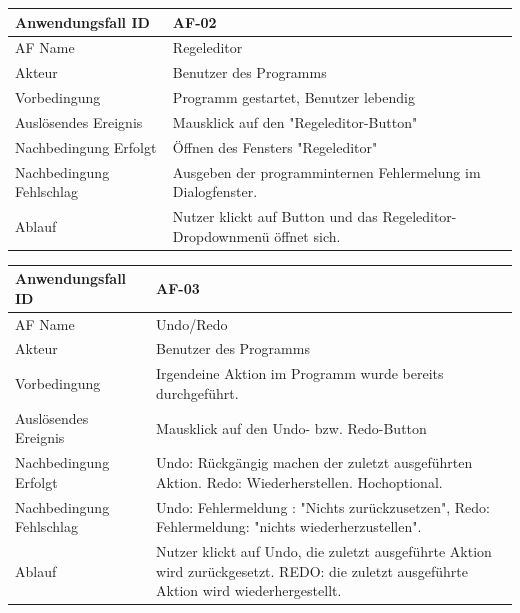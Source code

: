\documentclass[11pt,a4paper]{article}
\begin{document}
\begin{tabular}[m]{|m{7cm}|m{9cm}|}
    \hline
    Anwendungsfall ID     & AF-02 \\
         \hline
    AF Name     &  Regeleditor \\
         \hline
    Akteur&Benutzer des Programms \\
    \hline
    Vorbedingung&Programm gestartet, Benutzer lebendig\\
    \hline
    Auslösendes Ereignis&Mausklick auf den "Regeleditor-Button"\\
    \hline
    Nachbedingung Erfolgt&Öffnen des Fensters "Regeleditor"\\
    \hline
    Nachbedingung Fehlschlag&Ausgeben der programminternen Fehlermelung im Dialogfenster.\\
    \hline
    Ablauf&Nutzer klickt auf Button und das Regeleditor-Dropdownmenü öffnet sich.\\
    \hline
\end{tabular}
\par


\begin{tabular}[m]{|m{7cm}|m{9cm}|}
    \hline
    Anwendungsfall ID     & AF-03  \\
         \hline
    AF Name     &  Undo/Redo \\
         \hline
    Akteur&Benutzer des Programms \\
    \hline
    Vorbedingung&Irgendeine Aktion im Programm wurde bereits durchgeführt.\\
    \hline
    Auslösendes Ereignis&Mausklick auf den Undo- bzw. Redo-Button\\
    \hline
    Nachbedingung Erfolgt&Undo: Rückgängig machen der zuletzt ausgeführten Aktion. Redo: Wiederherstellen. Hochoptional.\\
    \hline
    Nachbedingung Fehlschlag&Undo: Fehlermeldung : "Nichts zurückzusetzen", Redo: Fehlermeldung: "nichts wiederherzustellen".\\
    \hline
    Ablauf&Nutzer klickt auf Undo, die zuletzt ausgeführte Aktion wird zurückgesetzt. REDO: die zuletzt ausgeführte Aktion wird wiederhergestellt.\\
    \hline
\end{tabular}
\par
\end{document}
